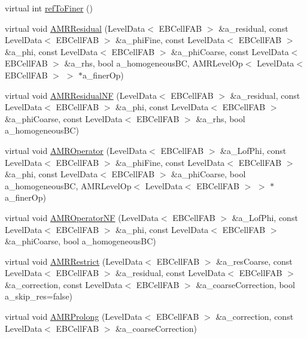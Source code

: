 \begin{DoxyCompactItemize}
\item 
virtual int \hyperlink{classebconductivityop_a08b2f00ce1511c076c652572c917937f}{ref\+To\+Finer} ()
\item 
virtual void \hyperlink{classebconductivityop_a697923b1539a7af1650af806f0b9101e}{A\+M\+R\+Residual} (Level\+Data$<$ E\+B\+Cell\+F\+AB $>$ \&a\+\_\+residual, const Level\+Data$<$ E\+B\+Cell\+F\+AB $>$ \&a\+\_\+phi\+Fine, const Level\+Data$<$ E\+B\+Cell\+F\+AB $>$ \&a\+\_\+phi, const Level\+Data$<$ E\+B\+Cell\+F\+AB $>$ \&a\+\_\+phi\+Coarse, const Level\+Data$<$ E\+B\+Cell\+F\+AB $>$ \&a\+\_\+rhs, bool a\+\_\+homogeneous\+BC, A\+M\+R\+Level\+Op$<$ Level\+Data$<$ E\+B\+Cell\+F\+AB $>$ $>$ $\ast$a\+\_\+finer\+Op)
\item 
virtual void \hyperlink{classebconductivityop_a6fed253bb84ca1ef96abe6710003d0f4}{A\+M\+R\+Residual\+NF} (Level\+Data$<$ E\+B\+Cell\+F\+AB $>$ \&a\+\_\+residual, const Level\+Data$<$ E\+B\+Cell\+F\+AB $>$ \&a\+\_\+phi, const Level\+Data$<$ E\+B\+Cell\+F\+AB $>$ \&a\+\_\+phi\+Coarse, const Level\+Data$<$ E\+B\+Cell\+F\+AB $>$ \&a\+\_\+rhs, bool a\+\_\+homogeneous\+BC)
\item 
virtual void \hyperlink{classebconductivityop_a6a789b3212848b575ad213e710def9be}{A\+M\+R\+Operator} (Level\+Data$<$ E\+B\+Cell\+F\+AB $>$ \&a\+\_\+\+Lof\+Phi, const Level\+Data$<$ E\+B\+Cell\+F\+AB $>$ \&a\+\_\+phi\+Fine, const Level\+Data$<$ E\+B\+Cell\+F\+AB $>$ \&a\+\_\+phi, const Level\+Data$<$ E\+B\+Cell\+F\+AB $>$ \&a\+\_\+phi\+Coarse, bool a\+\_\+homogeneous\+BC, A\+M\+R\+Level\+Op$<$ Level\+Data$<$ E\+B\+Cell\+F\+AB $>$ $>$ $\ast$a\+\_\+finer\+Op)
\item 
virtual void \hyperlink{classebconductivityop_ac6c434c48c9a3f5f0633b43d8a19a91b}{A\+M\+R\+Operator\+NF} (Level\+Data$<$ E\+B\+Cell\+F\+AB $>$ \&a\+\_\+\+Lof\+Phi, const Level\+Data$<$ E\+B\+Cell\+F\+AB $>$ \&a\+\_\+phi, const Level\+Data$<$ E\+B\+Cell\+F\+AB $>$ \&a\+\_\+phi\+Coarse, bool a\+\_\+homogeneous\+BC)
\item 
virtual void \hyperlink{classebconductivityop_a2551c5d7c1655b781e2c6e633939339f}{A\+M\+R\+Restrict} (Level\+Data$<$ E\+B\+Cell\+F\+AB $>$ \&a\+\_\+res\+Coarse, const Level\+Data$<$ E\+B\+Cell\+F\+AB $>$ \&a\+\_\+residual, const Level\+Data$<$ E\+B\+Cell\+F\+AB $>$ \&a\+\_\+correction, const Level\+Data$<$ E\+B\+Cell\+F\+AB $>$ \&a\+\_\+coarse\+Correction, bool a\+\_\+skip\+\_\+res=false)
\item 
virtual void \hyperlink{classebconductivityop_ae18832543fa25c492540f8c0c62ccffa}{A\+M\+R\+Prolong} (Level\+Data$<$ E\+B\+Cell\+F\+AB $>$ \&a\+\_\+correction, const Level\+Data$<$ E\+B\+Cell\+F\+AB $>$ \&a\+\_\+coarse\+Correction)

\end{DoxyCompactItemize}
